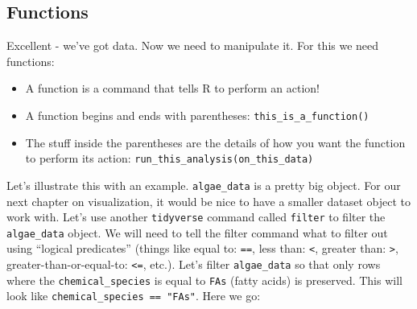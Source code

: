 \documentclass[
]{krantz}
\providecommand{\tightlist}{%
  \setlength{\itemsep}{0pt}\setlength{\parskip}{0pt}}
\begin{document}
\hypertarget{functions}{%
\subsection{Functions}\label{functions}}

Excellent - we've got data. Now we need to manipulate it. For this we need functions:

\begin{itemize}
\tightlist
\item
  A function is a command that tells R to perform an action!
\item
  A function begins and ends with parentheses: \texttt{this\_is\_a\_function()}
\item
  The stuff inside the parentheses are the details of how you want the function to perform its action: \texttt{run\_this\_analysis(on\_this\_data)}
\end{itemize}

Let's illustrate this with an example. \texttt{algae\_data} is a pretty big object. For our next chapter on visualization, it would be nice to have a smaller dataset object to work with. Let's use another \texttt{tidyverse} command called \texttt{filter} to filter the \texttt{algae\_data} object. We will need to tell the filter command what to filter out using ``logical predicates'' (things like equal to: \texttt{==}, less than: \texttt{\textless{}}, greater than: \texttt{\textgreater{}}, greater-than-or-equal-to: \texttt{\textless{}=}, etc.). Let's filter \texttt{algae\_data} so that only rows where the \texttt{chemical\_species} is equal to \texttt{FAs} (fatty acids) is preserved. This will look like \texttt{chemical\_species\ ==\ "FAs"}. Here we go:
\end{document}
